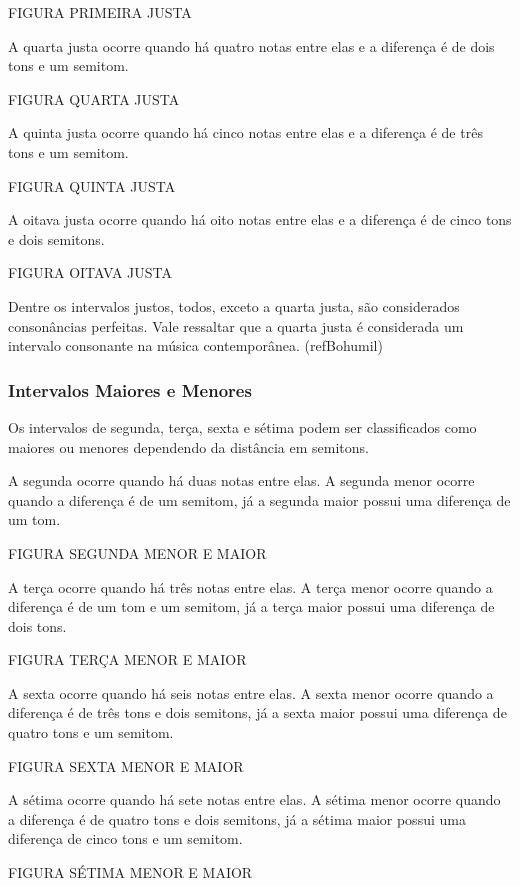         FIGURA PRIMEIRA JUSTA

        A quarta justa ocorre quando há quatro notas entre elas e a diferença é de dois tons e um semitom.

        FIGURA QUARTA JUSTA

        A quinta justa ocorre quando há cinco notas entre elas e a diferença é de três tons e um semitom.

        FIGURA QUINTA JUSTA

        A oitava justa ocorre quando há oito notas entre elas e a diferença é de cinco tons e dois semitons.

        FIGURA OITAVA JUSTA

        Dentre os intervalos justos, todos, exceto a quarta justa, são considerados consonâncias perfeitas. Vale ressaltar que a quarta justa é considerada um intervalo consonante na música contemporânea. (refBohumil)

      \subsubsection[Intervalos Maiores e Menores]{Intervalos Maiores e Menores}

        Os intervalos de segunda, terça, sexta e sétima podem ser classificados como maiores ou menores dependendo da distância em semitons.

        A segunda ocorre quando há duas notas entre elas. A segunda menor ocorre quando a diferença é de um semitom, já a segunda maior possui uma diferença de um tom.

        FIGURA SEGUNDA MENOR E MAIOR


        A terça ocorre quando há três notas entre elas. A terça menor ocorre quando a diferença é de um tom e um semitom, já a terça maior possui uma diferença de dois tons.

        FIGURA TERÇA MENOR E MAIOR

        A sexta ocorre quando há seis notas entre elas. A sexta menor ocorre quando a diferença é de três tons e dois semitons, já a sexta maior possui uma diferença de quatro tons e um semitom.

        FIGURA SEXTA MENOR E MAIOR

        A sétima ocorre quando há sete notas entre elas. A sétima menor ocorre quando a diferença é de quatro tons e dois semitons, já a sétima maior possui uma diferença de cinco tons e um semitom.

        FIGURA SÉTIMA MENOR E MAIOR

